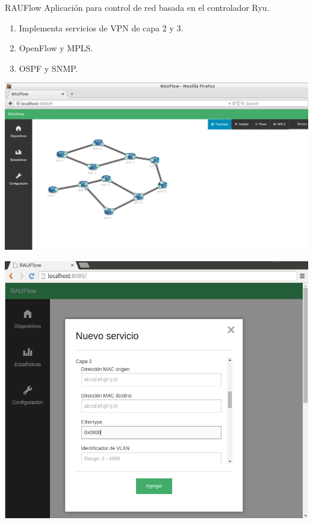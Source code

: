 \documentclass[xcolor=svgnames]{beamer}
\begin{document}
\begin{frame}{RAUFlow}
	Aplicación para control de red basada en el controlador Ryu.
	\begin{enumerate}
		\item Implementa servicios de VPN de capa 2 y 3.
		\item OpenFlow y MPLS.
		\item OSPF y SNMP.
	\end{enumerate}
	\begin{minipage}[b]{0.4\textwidth}
		\begin{center}
			\includegraphics[scale=0.20]{rauflow_interfaz2}
		\end{center}
	\end{minipage}
	\hfill
	\begin{minipage}[b]{0.4\textwidth}
		\begin{center}
			\includegraphics[scale=0.20]{rauflow_interfaz}
		\end{center}
	\end{minipage}
\end{frame}
\end{document}
